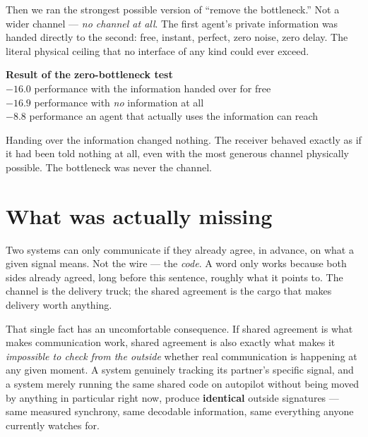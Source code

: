 \documentclass[11pt]{article}
\begin{document}
Then we ran the strongest possible version of ``remove the bottleneck.'' Not a wider channel --- \emph{no channel at all}. The first agent's private information was handed directly to the second: free, instant, perfect, zero noise, zero delay. The literal physical ceiling that no interface of any kind could ever exceed.

\begin{statbox}
\centering
\textbf{Result of the zero-bottleneck test}\\[4pt]
{\Large $-16.0$} \quad performance with the information handed over for free \\
{\Large $-16.9$} \quad performance with \emph{no} information at all\\
{\Large $-8.8$} \quad performance an agent that actually uses the information can reach
\end{statbox}

Handing over the information changed nothing. The receiver behaved exactly as if it had been told nothing at all, even with the most generous channel physically possible. The bottleneck was never the channel.

\section{What was actually missing}

Two systems can only communicate if they already agree, in advance, on what a given signal means. Not the wire --- the \emph{code}. A word only works because both sides already agreed, long before this sentence, roughly what it points to. The channel is the delivery truck; the shared agreement is the cargo that makes delivery worth anything.

That single fact has an uncomfortable consequence. If shared agreement is what makes communication work, shared agreement is also exactly what makes it \emph{impossible to check from the outside} whether real communication is happening at any given moment. A system genuinely tracking its partner's specific signal, and a system merely running the same shared code on autopilot without being moved by anything in particular right now, produce \textbf{identical} outside signatures --- same measured synchrony, same decodable information, same everything anyone currently watches for.

\begin{center}
\end{center}
\end{document}
